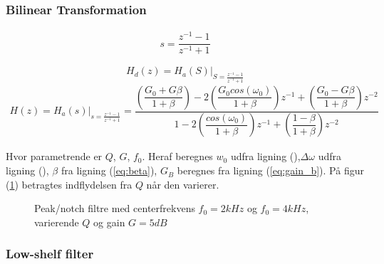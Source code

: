         \subsubsection{Bilinear Transformation}


    \begin{align}
    s =   \dfrac{z^{-1} - 1}{z^{-1} + 1}
    \end{align}

    \begin{equation}
    H_d(z) = H_a(S)\bigg|_{S = \frac{z^{-1} -1 }{z^{-1} + 1}}
    \end{equation}
   \begin{align}
    H(z) = H_a(s)\bigg|_{s = \frac{z^{-1} -1 }{z^{-1} + 1}} = 
    \dfrac{\left(\dfrac{G_0 + G \beta}{1 + \beta} \right)- 2 \left(\dfrac{G_0 cos( \omega_0)}{1 +\beta} \right)z^{-1} + \left(\dfrac{ G_0 - G \beta}{1 + \beta }\right) z^{-2}}{1 - 2 \left(\dfrac{cos(\omega_0)}{1 + \beta}\right)z^{-1} + \left( \dfrac{1 - \beta}{1 + \beta} \right) z^{-2}}
   \end{align}

   Hvor parametrende er $Q$, $G$, $f_0$. Heraf beregnes $w_0$ udfra ligning (),$\Delta \omega$ udfra ligning (), $\beta$ fra ligning (\ref{eq:beta}), $G_B$ beregnes fra ligning (\ref{eq:gain_b}).
   På figur (\ref{fig:iir_peak}) betragtes indflydelsen fra $Q$ når den varierer.

 \begin{figure}[H]
    \centering
            
        \caption{Peak/notch filtre med centerfrekvens $f_0 = 2kHz$ og $f_0 = 4kHz$, varierende $Q$ og gain $G=5dB$}
        \label{fig:iir_peak}
    \end{figure} 


     \subsubsection{Low-shelf filter}


